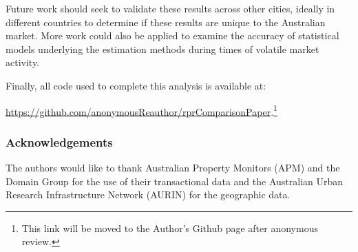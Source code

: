 \documentclass{article}\usepackage[]{graphicx}\usepackage[]{color}
\begin{document}
Future work should seek to validate these results across other cities, ideally in different countries to determine if these results are unique to the Australian market.  More work could also be applied to examine the accuracy of statistical models underlying the estimation methods during times of volatile market activity.\par

Finally, all code used to complete this analysis is available at:\par {\color{blue} \href{https://github.com/anonymousreAuthor/rprComparisonPaper}{https://github.com/anonymousReauthor/rprComparisonPaper}}.\footnote{This link will be moved to the Author's Github page after anonymous review.}\par

\subsubsection*{Acknowledgements}

The authors would like to thank Australian Property Monitors (APM) and the Domain Group for the use of their transactional data and the Australian Urban Research Infrastructure Network (AURIN) for the geographic data.


\end{document}
